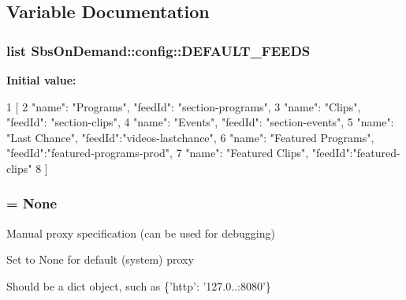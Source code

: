 \subsection{\-Variable \-Documentation}
\hypertarget{namespace_sbs_on_demand_1_1config_a95107892fe1ccd6a6cd18071586157a3}{
\subsubsection[{\-D\-E\-F\-A\-U\-L\-T\-\_\-\-F\-E\-E\-D\-S}]{\setlength{\rightskip}{0pt plus 5cm}list \-Sbs\-On\-Demand\-::config\-::\-D\-E\-F\-A\-U\-L\-T\-\_\-\-F\-E\-E\-D\-S}}
\label{namespace_sbs_on_demand_1_1config_a95107892fe1ccd6a6cd18071586157a3}
{\bfseries \-Initial value\-:}
\begin{DoxyCode}
1 [
2     {"name": "Programs", "feedId": "section-programs"},
3     {"name": "Clips", "feedId": "section-clips"},
4     {"name": "Events", "feedId": "section-events"},
5     {"name": "Last Chance", "feedId":"videos-lastchance"},
6     {"name": "Featured Programs", "feedId":"featured-programs-prod"},
7     {"name": "Featured Clips", "feedId":"featured-clips"}
8 ]
\end{DoxyCode}
\hypertarget{namespace_sbs_on_demand_1_1config_ab3e6260742211120f0f6f05d4c618711}{
\subsubsection[{\-P\-R\-O\-X\-Y}]{ = \-None}}
\label{namespace_sbs_on_demand_1_1config_ab3e6260742211120f0f6f05d4c618711}


\-Manual proxy specification (can be used for debugging) 

\-Set to \-None for default (system) proxy

\-Should be a dict object, such as \{'http'\-: '127.0..\-:8080'\} 
